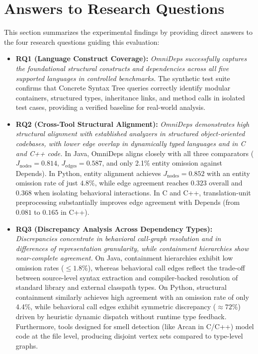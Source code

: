 \section{Answers to Research Questions}
\label{sec:answers_to_rqs}

This section summarizes the experimental findings by providing
direct answers to the four research questions guiding this evaluation:

\begin{itemize}[leftmargin=2.0em]
  \item \textbf{RQ1 (Language Construct Coverage):}
    \textit{OmniDeps successfully captures the foundational
      structural constructs and dependencies across all five
    supported languages in controlled benchmarks.}
    The synthetic test suite confirms that Concrete Syntax Tree
    queries correctly identify modular containers, structured
    types, inheritance links, and method calls in isolated test
    cases, providing a verified baseline for real-world analysis.

  \item \textbf{RQ2 (Cross-Tool Structural Alignment):}
    \textit{OmniDeps demonstrates high structural alignment with
      established analyzers in structured object-oriented codebases,
      with lower edge overlap in dynamically typed languages and
    in C and C++ code.}
    In Java, OmniDeps aligns closely with all three comparators
    ($J_{\text{nodes}} = 0.814$, $J_{\text{edges}} = 0.587$, and
    only 2.1\% entity omission against Depends). In Python, entity
    alignment achieves $J_{\text{nodes}} = 0.852$ with an entity
    omission rate of just $4.8\%$, while edge agreement reaches $0.323$ overall
    and $0.368$ when isolating behavioral interactions. In C and C++,
    translation-unit preprocessing substantially improves edge
    agreement with Depends (from $0.081$ to $0.165$ in C++).

  \item \textbf{RQ3 (Discrepancy Analysis Across Dependency Types):}
    \textit{Discrepancies concentrate in behavioral call-graph
      resolution and in differences of representation granularity,
    while containment hierarchies show near-complete agreement.}
    On Java, containment hierarchies exhibit low omission rates
    ($\le 1.8\%$), whereas behavioral call edges reflect the
    trade-off between source-level syntax extraction and compiler-backed
    resolution of standard library and external classpath types.
    On Python, structural containment similarly achieves high agreement
    with an omission rate of only 4.4\%, while behavioral call edges
    exhibit symmetric discrepancy ($\approx 72\%$) driven by heuristic
    dynamic dispatch without runtime type feedback.
    Furthermore, tools designed for smell
    detection (like Arcan in C/C++) model code at the file level,
    producing disjoint vertex sets compared to type-level graphs.


\end{itemize}
